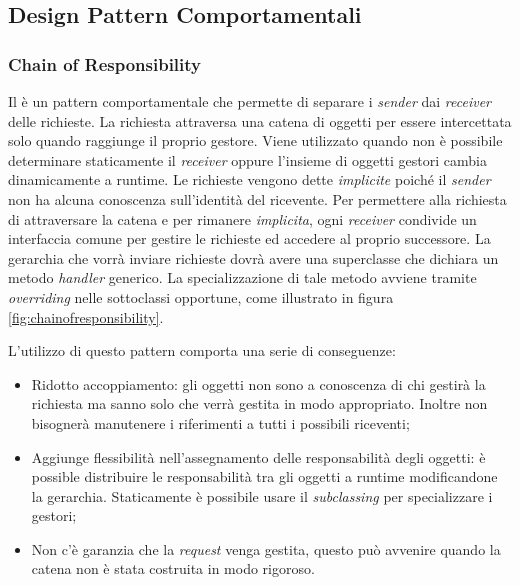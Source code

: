 \subsection{Design Pattern Comportamentali}

\subsubsection{Chain of Responsibility}
Il  è un pattern comportamentale che permette di separare i \emph{sender} dai \emph{receiver} delle richieste. La richiesta attraversa una catena di oggetti per essere intercettata solo quando raggiunge il proprio gestore. Viene utilizzato quando non è possibile determinare staticamente il \emph{receiver} oppure l'insieme di oggetti gestori cambia dinamicamente a runtime.
Le richieste vengono dette \emph{implicite} poiché il \emph{sender} non ha alcuna conoscenza sull'identità del ricevente. Per permettere alla richiesta di attraversare la catena e per rimanere \emph{implicita}, ogni \emph{receiver} condivide un interfaccia comune per gestire le richieste ed accedere al proprio successore. 
La gerarchia che vorrà inviare richieste dovrà avere una superclasse che dichiara un metodo \emph{handler} generico. La specializzazione di tale metodo avviene tramite \emph{overriding} nelle sottoclassi opportune, come illustrato in figura \ref{fig:chainofresponsibility}.	

L'utilizzo di questo pattern comporta una serie di conseguenze:
		
\begin{itemize}

	\item Ridotto accoppiamento: gli oggetti non sono a conoscenza di chi gestirà la richiesta ma sanno solo che verrà gestita in modo appropriato. Inoltre non bisognerà manutenere i riferimenti a tutti i possibili riceventi;
	\item Aggiunge flessibilità nell'assegnamento delle responsabilità degli oggetti: è possible distribuire le responsabilità tra gli oggetti a runtime modificandone la gerarchia. Staticamente è possibile usare il \emph{subclassing} per specializzare i gestori;
 	\item Non c'è garanzia che la \emph{request} venga gestita, questo può avvenire quando la catena non è stata costruita in modo rigoroso.
 	
\end{itemize}
	 	
